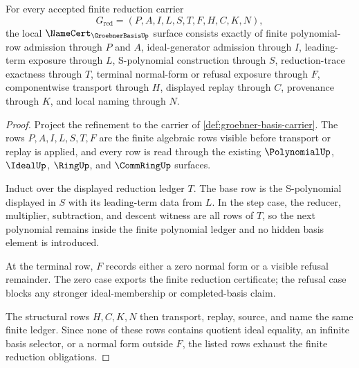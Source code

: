 \begin{theorem}
\label{thm:groebner-basis-finite-reduction-namecert-obligations}
For every accepted finite reduction carrier
$$
G_{\mathrm{red}}=(P,A,I,L,S,T,F,H,C,K,N),
$$
the local $\NameCert_{\GroebnerBasisUp}$ surface consists exactly of finite polynomial-row admission through $P$ and $A$, ideal-generator admission through $I$, leading-term exposure through $L$, S-polynomial construction through $S$, reduction-trace exactness through $T$, terminal normal-form or refusal exposure through $F$, componentwise transport through $H$, displayed replay through $C$, provenance through $K$, and local naming through $N$.
\end{theorem}
\begin{proof}
Project the refinement to the carrier of \autoref{def:groebner-basis-carrier}. The rows $P,A,I,L,S,T,F$ are the finite algebraic rows visible before transport or replay is applied, and every row is read through the existing $\PolynomialUp$, $\IdealUp$, $\RingUp$, and $\CommRingUp$ surfaces.

Induct over the displayed reduction ledger $T$. The base row is the S-polynomial displayed in $S$ with its leading-term data from $L$. In the step case, the reducer, multiplier, subtraction, and descent witness are all rows of $T$, so the next polynomial remains inside the finite polynomial ledger and no hidden basis element is introduced.

At the terminal row, $F$ records either a zero normal form or a visible refusal remainder. The zero case exports the finite reduction certificate; the refusal case blocks any stronger ideal-membership or completed-basis claim.

The structural rows $H,C,K,N$ then transport, replay, source, and name the same finite ledger. Since none of these rows contains quotient ideal equality, an infinite basis selector, or a normal form outside $F$, the listed rows exhaust the finite reduction obligations.
\end{proof}

